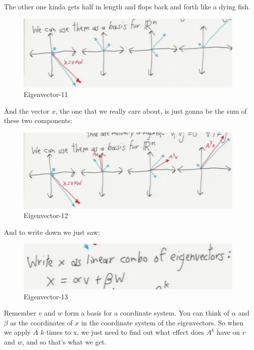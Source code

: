 \documentclass[fleqn,10pt]{olplainarticle}
\theoremstyle{definition}
\theoremstyle{remark}
\begin{document}
The other one kinda gets half in length and flops back and forth like a dying fish.

\begin{figure}[ht]
\centering
\includegraphics[width=1.0\linewidth]{images/chpt08-11}
\caption{Eigenvector-11}
\label{fig:chpt08-11}
\end{figure}

And the vector $x$, the one that we really care about, is just gonna be the sum of these two components:

\begin{figure}[ht]
\centering
\includegraphics[width=1.0\linewidth]{images/chpt08-12}
\caption{Eigenvector-12}
\label{fig:chpt08-12}
\end{figure}

And to write down we just saw:

\begin{figure}[ht]
\centering
\includegraphics[width=1.0\linewidth]{images/chpt08-13}
\caption{Eigenvector-13}
\label{fig:chpt08-13}
\end{figure}
\clearpage


Remember $v$ and $w$ form a basis for a coordinate system. You can think of $\alpha$ and $\beta$ as the coordinates of $x$ in the coordinate system of the eigenvectors. So when we apply $A$ $k$ times to x, we just need to find out what effect does $A^k$ have on $v$ and $w$, and so that's what we get.
\end{document}
